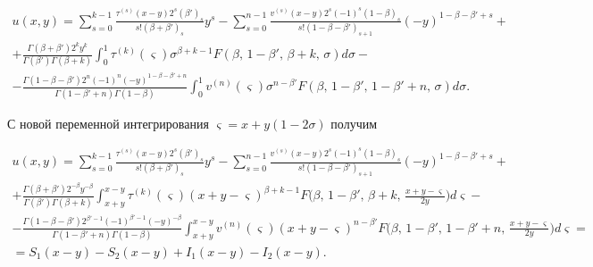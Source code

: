 \begin{multline*} 


u(x,y)=\sum^{k-1}_{s=0}\frac{\tau^{(s)}(x-y)2^s(\beta')_s} 


{s!(\beta+\beta')_s}y^s-\sum^{n-1}_{s=0} 


\frac{v^{(s)}(x-y)2^s(-1)^s(1-\beta)_s} 


{s!(1-\beta-\beta')_{s+1}}(-y)^{1-\beta-\beta'+s}+ \\ 


% 


+\frac{\Gamma(\beta+\beta')2^ky^k} 


{\Gamma(\beta')\Gamma(\beta+k)}\int^1_0\tau^{(k)}(\varsigma) 


\sigma^{\beta+k-1}F(\beta,\,1-\beta',\,\beta+k,\,\sigma)d\sigma-\\ 


% 


-\frac{\Gamma(1-\beta-\beta')2^n(-1)^n(-y)^{1-\beta-\beta'+n}} 


{\Gamma(1-\beta'+n)\Gamma(1-\beta)}\int^1_0 v^{(n)} 


(\varsigma)\sigma^{n-\beta'}F(\beta,\,1-\beta',\,1-\beta'+n,\,\sigma) 


d\sigma. 


\end{multline*} 


С новой переменной интегрирования $\varsigma=x+y(1-2\sigma)$ получим 


\begin{multline} 


u(x,y)=\sum^{k-1}_{s=0}\frac{\tau^{(s)}(x-y)2^s(\beta')_s} 


{s!(\beta+\beta')_s}y^s-\sum^{n-1}_{s=0} 


\frac{v^{(s)}(x-y)2^s(-1)^s(1-\beta)_s} 


{s!(1-\beta-\beta')_{s+1}}(-y)^{1-\beta-\beta'+s}+\\ 


% 


+\frac{\Gamma(\beta+\beta')2^{-\beta}y^{-\beta}} 


{\Gamma(\beta')\Gamma(\beta+k)}\int^{x-y}_{x+y}\tau^{(k)}(\varsigma) 


(x+y-\varsigma)^{\beta+k-1}F\bigg(\beta,\,1-\beta',\,\beta+k,\, 


\frac{x+y-\varsigma}{2y}\bigg)d\varsigma-\\ 


% 


-\frac{\Gamma(1-\beta-\beta')2^{\beta'-1}(-1)^{\beta'-1}(-y)^{-\beta}} 


{\Gamma(1-\beta'+n)\Gamma(1-\beta)}\int^{x-y}_{x+y} 


v^{(n)}(\varsigma)(x+y-\varsigma)^{n-\beta'}F\bigg(\beta,\, 


1-\beta',\,1-\beta'+n,\,\frac{x+y-\varsigma}{2y}\bigg)d\varsigma=\\ 


% 


=S_1(x-y)-S_2(x-y)+I_1(x-y)-I_2(x-y). 


\end{multline} 


